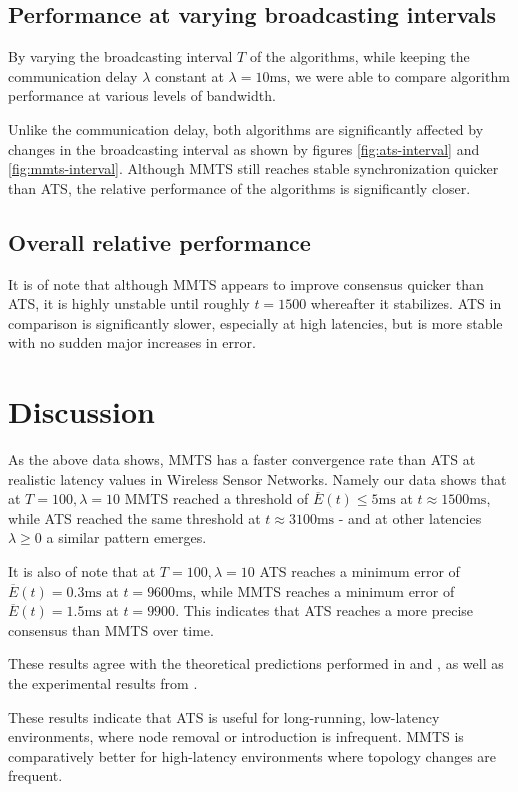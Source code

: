 \documentclass[a4paper,12pt]{article}
\begin{document}
\subsection{Performance at varying broadcasting intervals}
By varying the broadcasting interval $T$ of the algorithms, while keeping the communication delay $\lambda$ constant at $\lambda = 10 \text{ms}$, we were able to compare algorithm performance at various levels of bandwidth.

Unlike the communication delay, both algorithms are significantly affected by changes in the broadcasting interval as shown by figures \ref{fig:ats-interval} and \ref{fig:mmts-interval}. Although MMTS still reaches stable synchronization quicker than ATS, the relative performance of the algorithms is significantly closer.

\subsection{Overall relative performance}
It is of note that although MMTS appears to improve consensus quicker than ATS, it is highly unstable until roughly $t = 1500$ whereafter it stabilizes. ATS in comparison is significantly slower, especially at high latencies, but is more stable with no sudden major increases in error.

\section{Discussion}
As the above data shows, MMTS has a faster convergence rate than ATS at realistic latency values in Wireless Sensor Networks. Namely our data shows that at $T = 100, \lambda = 10$ MMTS reached a threshold of $\overline{E}(t) \leq 5\text{ms}$ at $t \approx 1500\text{ms}$, while ATS reached the same threshold at $t \approx 3100\text{ms}$ - and at other latencies $\lambda \geq 0$ a similar pattern emerges.

It is also of note that at $T = 100, \lambda = 10$ ATS reaches a minimum error of $\overline{E}(t) = 0.3\text{ms}$ at $t = 9600\text{ms}$, while MMTS reaches a minimum error of $\overline{E}(t) = 1.5\text{ms}$ at $t = 9900$. This indicates that ATS reaches a more precise consensus than MMTS over time.

These results agree with the theoretical predictions performed in \citet{LucaFiorentin11} and \citet{HeLiChenCheng13}, as well as the experimental results from \citet{HeLiChenCheng13}.

These results indicate that ATS is useful for long-running, low-latency environments, where node removal or introduction is infrequent. MMTS is comparatively better for high-latency environments where topology changes are frequent.
\end{document}
